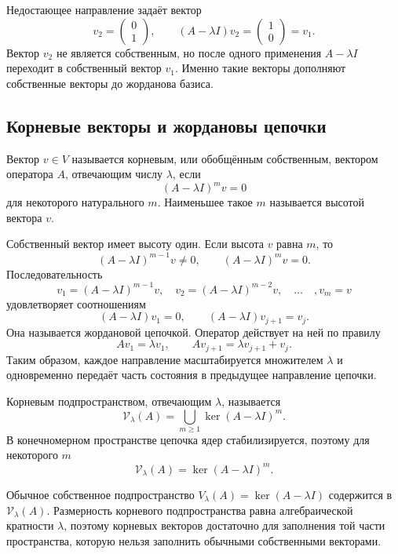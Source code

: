 Недостающее направление задаёт вектор
\[
v_2=
\begin{pmatrix}0\\1\end{pmatrix},
\qquad
(A-\lambda I)v_2=
\begin{pmatrix}1\\0\end{pmatrix}=v_1.
\]
Вектор $v_2$ не является собственным, но после одного применения $A-\lambda I$ переходит в собственный вектор $v_1$. Именно такие векторы дополняют собственные векторы до жорданова базиса.

\subsection{Корневые векторы и жордановы цепочки}

\begin{definition}
Вектор $v\in V$ называется корневым, или обобщённым собственным, вектором оператора $A$, отвечающим числу $\lambda$, если
\[
(A-\lambda I)^m v=0
\]
для некоторого натурального $m$. Наименьшее такое $m$ называется высотой вектора $v$.
\end{definition}

Собственный вектор имеет высоту один. Если высота $v$ равна $m$, то
\[
(A-\lambda I)^{m-1}v\neq0,
\qquad
(A-\lambda I)^m v=0.
\]
Последовательность
\[
v_1=(A-\lambda I)^{m-1}v,
\quad
v_2=(A-\lambda I)^{m-2}v,
\quad\dots\quad,
v_m=v
\]
удовлетворяет соотношениям
\[
(A-\lambda I)v_1=0,
\qquad
(A-\lambda I)v_{j+1}=v_j.
\]
Она называется жордановой цепочкой. Оператор действует на ней по правилу
\[
Av_1=\lambda v_1,
\qquad
Av_{j+1}=\lambda v_{j+1}+v_j.
\]
Таким образом, каждое направление масштабируется множителем $\lambda$ и одновременно передаёт часть состояния в предыдущее направление цепочки.

\begin{definition}
Корневым подпространством, отвечающим $\lambda$, называется
\[
\mathcal V_\lambda(A)
=
\bigcup_{m\geq1}\ker(A-\lambda I)^m.
\]
В конечномерном пространстве цепочка ядер стабилизируется, поэтому для некоторого $m$
\[
\mathcal V_\lambda(A)=\ker(A-\lambda I)^m.
\]
\end{definition}

Обычное собственное подпространство $V_\lambda(A)=\ker(A-\lambda I)$ содержится в $\mathcal V_\lambda(A)$. Размерность корневого подпространства равна алгебраической кратности $\lambda$, поэтому корневых векторов достаточно для заполнения той части пространства, которую нельзя заполнить обычными собственными векторами.


